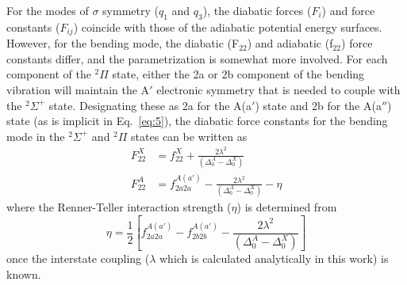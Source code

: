 \documentclass[aip,graphicx]{revtex4-1}
\begin{document}
For the modes of $\sigma$ symmetry ($q_1$ and $q_3$), the diabatic forces ($F_i$) and force constants ($F_{ij}$) coincide with those of the adiabatic potential energy surfaces.   However, for the bending mode, the diabatic (F$_{22}$) and adiabatic (f$_{22}$) force constants differ, and the parametrization is somewhat more involved.   For each component of the $^2\Pi$ state, either the 2a or 2b component of the bending vibration will maintain the A$'$ electronic symmetry that is needed to couple with the $^2\Sigma^+$ state.  Designating these as 2a for the A(a$'$) state and 2b for the A(a$''$) state (as is implicit in Eq.~\ref{eq:5}), the diabatic force constants for the bending mode in the $^2\Sigma^+$ and $^2\Pi$ states can be written as 
\begin{align}
F_{22}^X &= f_{22}^X+\frac{2\lambda^2}{(\Delta_0^A-\Delta_0^X)}\\
F_{22}^A &= f_{2a2a}^{A(a')}-\frac{2\lambda^2}{(\Delta_0^A-\Delta_0^X)}-\eta
\label{eq:7}
\end{align}
where the Renner-Teller interaction strength ($\eta$) is determined from 
\begin{equation}
\eta = \frac{1}{2}\left[ f_{2a2a}^{A(a')}-f_{2b2b}^{A(a')}-\frac{2\lambda^2}{(\Delta_0^A-\Delta_0^X)}\right]
\label{eq:8}
\end{equation}
once the interstate coupling ($\lambda$ which is calculated analytically in this work) is known.
\end{document}
